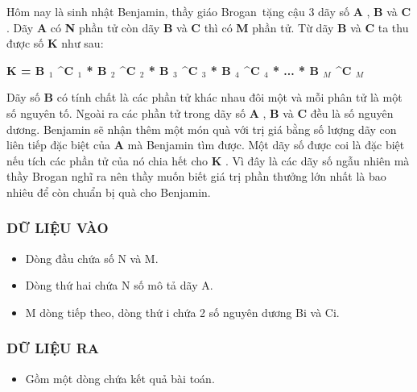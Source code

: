 



   Hôm nay là sinh nhật Benjamin, thầy giáo Brogan tặng cậu 3 dãy số   \textbf{    A   }   ,   \textbf{    B   }   và   \textbf{    C   }   . Dãy   \textbf{    A   }   có   \textbf{    N   }   phần tử còn dãy   \textbf{    B   }   và   \textbf{    C   }   thì có   \textbf{    M   }   phần tử. Từ dãy   \textbf{    B   }   và   \textbf{    C   }   ta thu được số   \textbf{    K   }   như sau:  

\textbf{    K = B    $_     1    $    ^C    $_     1    $    * B    $_     2    $    ^C    $_     2    $    * B    $_     3    $    ^C    $_     3    $    * B    $_     4    $    ^C    $_     4    $    * ... * B    $_     M    $    ^C    $_     M    $}

   Dãy số   \textbf{    B   }   có tính chất là các phần tử khác nhau đôi một và mỗi phân tử là một số nguyên tố. Ngoài ra các phần tử trong dãy số   \textbf{    A   }   ,   \textbf{    B   }   và   \textbf{    C   }   đều là số nguyên dương. Benjamin sẽ nhận thêm một món quà với trị giá bằng số lượng dãy con liên tiếp đặc biệt của   \textbf{    A   }   mà Benjamin tìm được. Một dãy số được coi là đặc biệt nếu tích các phần tử của nó chia hết cho   \textbf{    K   }   . Vì đây là các dãy số ngẫu nhiên mà thầy Brogan nghĩ ra nên thầy muốn biết giá trị phần thưởng lớn nhất là bao nhiêu để còn chuẩn bị quà cho Benjamin.  

\subsubsection{   DỮ LIỆU VÀO  }


\begin{itemize}
	\item     Dòng đầu chứa số N và M.   
	\item     Dòng thứ hai chứa N số mô tả dãy A.   
	\item     M dòng tiếp theo, dòng thứ i chứa 2 số nguyên dương Bi và Ci.   
\end{itemize}



\subsubsection{   DỮ LIỆU RA  }
\begin{itemize}
	\item     Gồm một dòng chứa kết quả bài toán.   
\end{itemize}

